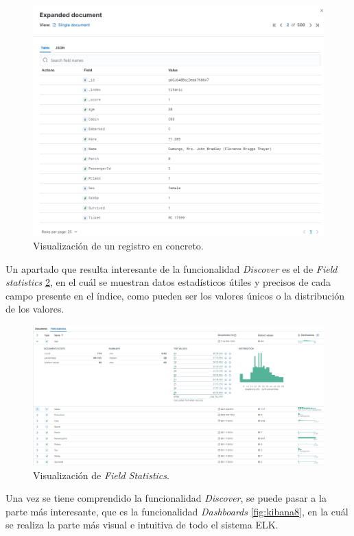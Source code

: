 \begin{figure}
    \centering
    \includegraphics[width=1\linewidth]{img/kibana6.png}
    \caption{Visualización de un registro en concreto.}
    \label{fig:kibana6}
\end{figure}

Un apartado que resulta interesante de la funcionalidad \textit{Discover} es el de \textit{Field statistics} \ref{fig:kibana5}, en el cuál se muestran datos estadísticos útiles y precisos de cada campo presente en el índice, como pueden ser los valores únicos o la distribución de los valores.

\begin{figure}
    \centering
    \includegraphics[width=1\linewidth]{img/kibana7.png}
    \caption{Visualización de \textit{Field Statistics}.}
    \label{fig:kibana5}
\end{figure}

Una vez se tiene comprendido la funcionalidad \textit{Discover}, se puede pasar a la parte más interesante, que es la funcionalidad \textit{Dashboards} \ref{fig:kibana8}, en la cuál se realiza la parte más visual e intuitiva de todo el sistema ELK.

